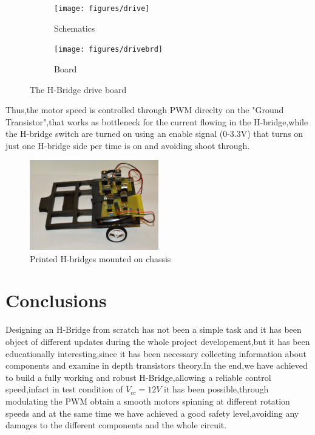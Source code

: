 \begin{figure}[!ht]
	\begin{subfigure}{.49\textwidth}
		\centering
		\texttt{[image: figures/drive]}
		\caption{Schematics}
		\label{fig:driveSCH}
	\end{subfigure}
	\begin{subfigure}{.49\textwidth}
		\centering
		\texttt{[image: figures/drivebrd]}
		\caption{Board}
		\label{fig:driveBRD}
	\end{subfigure}
\caption{The H-Bridge drive board}
\label{fig:driveH}
\end{figure}

Thus,the motor speed is controlled through PWM direclty on the "Ground Transistor",that works as bottleneck for the current flowing in the H-bridge,while the H-bridge switch are turned on using an enable signal (0-3.3V) that turns on just one H-bridge side per time is on and avoiding shoot through. 

\begin{figure}[!ht]
	\centering
	\includegraphics[width=0.5\textwidth]{figures/printbridge}
	\caption{Printed H-bridges mounted on chassis}
	\label{fig:bridgemount}
\end{figure}
\newpage

\section{Conclusions}

Designing an H-Bridge from scratch has not been a simple task and it has been object of different updates during the whole project developement,but it has been educationally interesting,since it has been necessary collecting information about components and examine in depth transistors theory.In the end,we have achieved to build a fully working and robust H-Bridge,allowing a reliable control speed,infact in test condition of $V_{cc}=12 V$ it has been possible,through modulating the PWM obtain a smooth motors spinning at different rotation speeds and at the same time we have achieved a good safety level,avoiding any damages to the different components and the whole circuit.